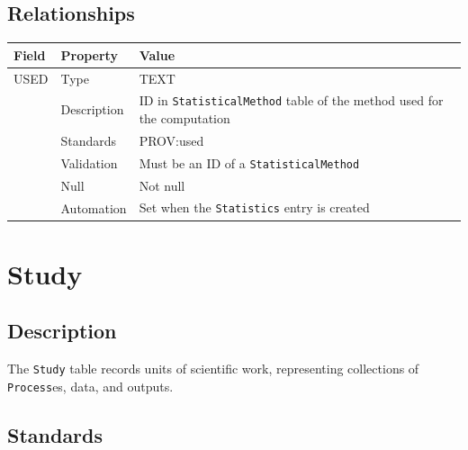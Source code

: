 \documentclass[
]{article}
\newcounter{none}
\begin{document}
\subsection{Relationships}\label{relationships-27}

{\def\LTcaptype{none} 
\begin{longtable}[]{@{}
  >{\raggedright\arraybackslash}p{}
  >{\raggedright\arraybackslash}p{}
  >{\raggedright\arraybackslash}p{}@{}}
\toprule\noalign{}
\begin{minipage}[b]{\linewidth}\raggedright
Field
\end{minipage} & \begin{minipage}[b]{\linewidth}\raggedright
Property
\end{minipage} & \begin{minipage}[b]{\linewidth}\raggedright
Value
\end{minipage} \\
\midrule\noalign{}
\endhead
\bottomrule\noalign{}
\endlastfoot
USED & Type & TEXT \\
& Description & ID in \texttt{StatisticalMethod} table of the method
used for the computation \\
& Standards & PROV:used \\
& Validation & Must be an ID of a \texttt{StatisticalMethod} \\
& Null & Not null \\
& Automation & Set when the \texttt{Statistics} entry is created \\
\end{longtable}
}

\section{Study}\label{study}

\subsection{Description}\label{description-32}

The \texttt{Study} table records units of scientific work, representing
collections of \texttt{Process}es, data, and outputs.

\subsection{Standards}\label{standards-34}
\end{document}
